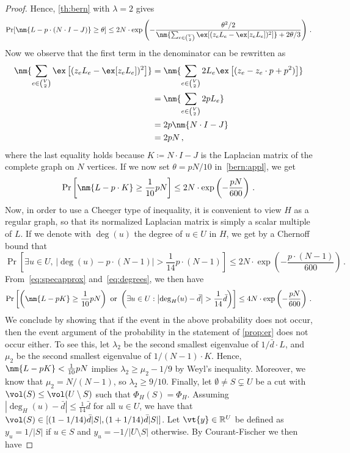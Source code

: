 \begin{proof}
	Hence, \cref{th:bern} with $\lambda=2$ gives
	\begin{equation}
		\label{bern:appl}
		\Pr[\nm{L-p \cdot (N \cdot I-J)} \ge \theta] \le 2N \cdot \exp\left(-\frac{\theta^2/2}{\nm{ \sum_{e \in \binom{V}{2}} \ex[(z_e L_e - \ex[z_eL_e])^2]}+2\theta/3}\right) \,.
	\end{equation}
	Now we observe that the first term in the denominator can be rewritten as
	\begin{align*}
		\nm{ \sum_{e \in \binom{V}{2}} \ex\left[(z_e L_e - \ex[z_eL_e])^2\right]} & = \nm{ \sum_{e \in \binom{V}{2}} 2L_e\ex\left[(z_e-z_e\cdot p+p^2)\right]} \\
		& = \nm{ \sum_{e \in \binom{V}{2}} 2pL_e} \\
		& = 2p \nm{N \cdot I-J} \\
		& = 2pN	\, ,
	\end{align*}
	where the last equality holds because $K \coloneqq N \cdot I-J$ is the Laplacian matrix of the complete graph on $N$ vertices. If we now set $\theta = pN/10$ in~\eqref{bern:appl}, we get
	\begin{equation}
		\label{eq:specapprox}
		\Pr\left[\nm{L-p \cdot K} \ge \frac{1}{10}pN\right] \le  2N \cdot \exp\left(-\frac{pN}{600}\right) \, .
	\end{equation}
	Now, in order to use a Cheeger type of inequality, it is convenient to view $H$ as a regular graph, so that its normalized Laplacian matrix is simply a scalar multiple of $L$. If we denote with $\deg(u)$ the degree of $u \in U$ in $H$, we get by a Chernoff bound that
	\begin{equation}
		\label{eq:degrees}
		\Pr\left[\text{$\exists u \in U$, } \left|\deg(u) - p\cdot (N-1)\right| > \frac{1}{14}p \cdot (N-1)\right] \le 2N \cdot \exp\left(-\frac{p\cdot (N-1)}{600}\right) \,.
	\end{equation}
	From~\eqref{eq:specapprox} and~\eqref{eq:degrees}, we then have
	\begin{equation}
		\label{eq:sectolast}
			\Pr\left[\left(\nm{L-p K} \ge \frac{1}{10}pN\right)\text{ or } \left(\exists u \in U : \left|\deg_H(u)-\bar{d}\right|>\frac{1}{14} \bar{d}\right)\right] \le 4N \cdot \exp\left(-\frac{pN}{600}\right) \, .
	\end{equation}
	We conclude by showing that if the event in the above probability does not occur, then the event argument of the probability in the statement of \cref{prop:er} does not occur either. To see this, let $\lambda_2$ be the second smallest eigenvalue of $1/\bar{d}  \cdot L$, and $\mu_2$ be the second smallest eigenvalue of $1/(N-1) \cdot K$. Hence, $\nm{L-p K} < \frac{1}{10}pN$ implies $\lambda_2 \ge \mu_2-1/9$ by Weyl's inequality. Moreover, we know that $\mu_2 = N/(N-1)$, so $\lambda_2 \ge 9/10$. Finally, let $\emptyset \neq S \subsetneq U$ be a cut with $\vol(S) \le \vol(U\setminus S)$ such that $\Phi_H(S) = \Phi_H$. Assuming $\left|\deg_H(u)-\bar{d}\right|\le \frac{1}{14} \bar{d}$ for all $u \in U$, we have that $\vol(S) \in [(1-1/14)\bar{d} |S|, (1+1/14)\bar{d} |S|]$. Let $\vt{y} \in \mathbb{R}^U$ be defined as $y_u = 1/|S|$ if $u \in S$ and $y_u=-1/|U \setminus S|$ otherwise. By Courant-Fischer we then have

\end{proof}
